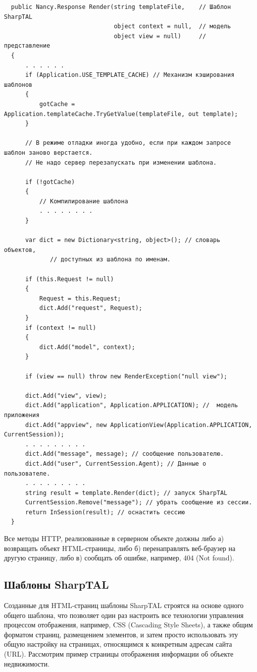 \documentclass[a4paper,14pt,openany,final]{extreport} %
\begin{document}
{\begin{verbatim}
  public Nancy.Response Render(string templateFile,    // Шаблон SharpTAL
                               object context = null,  // модель
                               object view = null)     // представление
  {
      . . . . . .
      if (Application.USE_TEMPLATE_CACHE) // Механизм кэширования шаблонов
      {
          gotCache = Application.templateCache.TryGetValue(templateFile, out template);
      }

      // В режиме отладки иногда удобно, если при каждом запросе шаблон заново верстается.
      // Не надо сервер перезапускать при изменении шаблона.

      if (!gotCache)
      {
          // Компилирование шаблона
          . . . . . . . .
      }

      var dict = new Dictionary<string, object>(); // словарь объектов,
             // доступных из шаблона по именам.

      if (this.Request != null)
      {
          Request = this.Request;
          dict.Add("request", Request);
      }
      if (context != null)
      {
          dict.Add("model", context);
      }

      if (view == null) throw new RenderException("null view");

      dict.Add("view", view);
      dict.Add("application", Application.APPLICATION); //  модель приложения
      dict.Add("appview", new ApplicationView(Application.APPLICATION, CurrentSession));
      . . . . . . . . .
      dict.Add("message", message); // сообщение пользователю.
      dict.Add("user", CurrentSession.Agent); // Данные о пользователе.
      . . . . . . . . .
      string result = template.Render(dict); // запуск SharpTAL
      CurrentSession.Remove("message"); // убрать сообщение из сессии.
      return InSession(result); // оснастить сессию
  }
\end{verbatim}

Все методы HTTP, реализованные в серверном объекте должны либо а) возвращать объект HTML-страницы, либо б) перенаправлять веб-браузер на другую страницу, либо в) сообщать об ошибке, например, 404 (\foreignlanguage{english}{Not found}).

\subsection{Шаблоны SharpTAL}

Созданные для HTML-страниц шаблоны SharpTAL строятся на основе одного общего шаблона, что позволяет один раз настроить все технологии управления процессом отображения, например, CSS (\foreignlanguage{english}{Cascading Style Sheets}), а также общим форматом страниц, размещением элементов, и затем просто использовать эту общую настройку на страницах, относящимся к конкретным адресам сайта (URL). Рассмотрим пример страницы отображения информации об объекте недвижимости.

}
\end{document}
